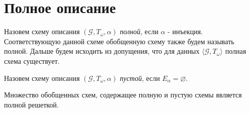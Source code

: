 \documentclass[a4paper,12pt]{article}
\begin{document}
\section{Полное описание}

Назовем схему описания $(\mathcal{G},T_{\omega},\alpha)$ {\it полной}, если $\alpha$ - инъекция. Соответствующую данной
схеме обобщенную схему также будем называть полной. Дальше будем исходить из допущения, что для данных $\langle\mathcal{G},T_{\omega}\rangle$ полная схема существует.

Назовем схему описания $(\mathcal{G},T_{\omega},\alpha)$ {\it пустой}, если $E_{\alpha} = \varnothing $. 

\begin{theorem}
Множество обобщенных схем, содержащее полную и пустую схемы является полной решеткой.
\end{theorem}


\end{document}
